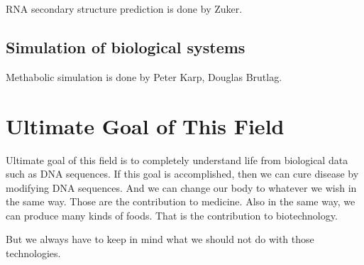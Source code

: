 RNA secondary structure prediction is done by Zuker.


\subsection{Simulation of biological systems}

Methabolic simulation is done by Peter Karp, Douglas Brutlag.

\section{Ultimate Goal of This Field}

Ultimate goal of this field is to completely understand life from 
biological data such as DNA sequences. If this goal is accomplished, then
we can cure disease by modifying DNA sequences. And we can change our body
to whatever we wish in the same way. Those are the contribution to medicine.
Also in the same way, we can produce many kinds of foods. That is 
the contribution to biotechnology.

But we always have to keep in mind what we should not do with those 
technologies.




